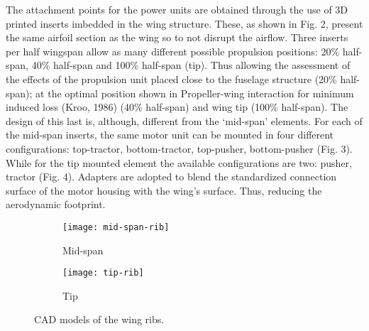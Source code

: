 \documentclass[../../main.tex]{subfiles}
\begin{document}
The attachment points for the power units are obtained through the use of 3D printed inserts imbedded in the wing structure.
These, as shown in Fig. 2, present the same airfoil section as the wing so to not disrupt the airflow.
Three inserts per half wingspan allow as many different possible propulsion positions: 20\% half-span, 40\% half-span and 100\% half-span (tip).
Thus allowing the assessment of the effects of the propulsion unit placed close to the fuselage structure (20\% half-span); at the optimal position shown in Propeller-wing interaction for minimum induced loss (Kroo, 1986) (40\% half-span) and wing tip (100\% half-span).
The design of this last is, although, different from the ‘mid-span’ elements.
For each of the mid-span inserts, the same motor unit can be mounted in four different configurations: top-tractor, bottom-tractor, top-pusher, bottom-pusher (Fig. 3).
While for the tip mounted element the available configurations are two: pusher, tractor (Fig. 4).
Adapters are adopted to blend the standardized connection surface of the motor housing with the wing’s surface.
Thus, reducing the aerodynamic footprint. 


\begin{figure}[H]
    \centering
    \begin{subfigure}[b]{0.49\columnwidth}
        \centering
        \texttt{[image: mid-span-rib]}
        \caption{Mid-span}
        \label{fig:ribs:mid-span}
    \end{subfigure}
    \hfill
    \begin{subfigure}[b]{0.49\columnwidth}
        \centering
        \texttt{[image: tip-rib]}
        \caption{Tip}
        \label{fig:ribs:tip}
    \end{subfigure}
    
    \caption{CAD models of the wing ribs.}
    \label{fig:ribs}
\end{figure}

\end{document}
